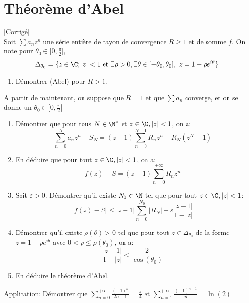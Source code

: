 \documentclass{book}
\begin{document}

\section{Théorème d'Abel}
\label{Théorème d'Abel}
\textcolor{blue}{\hyperref[sec:theoreme-dabel]{[Corrigé]}}\\
Soit  $\sum\limits a_nz^n$ une série entière de rayon de convergence $R\geq 1$ et de somme $f$. On note pour $\theta_0 \in [0,\displaystyle\frac{\pi}{2}[$, $$\Delta_{\theta_0}=\{z\in\C; |z|<1 \text{ et }\exists \rho>0,\exists\theta\in[-\theta_0,\theta_0],\ z=1-\rho e^{i\theta}\}$$ 
\begin{enumerate}[leftmargin=*]
	\item Démontrer (Abel) pour $R>1$.
\end{enumerate}
A partir de maintenant, on suppose que $R=1$ et que $\sum a_n$ converge, et on se donne un $\theta_0 \in [0,\displaystyle\frac{\pi}{2}[$
\begin{enumerate}[resume, leftmargin=*]
	\item Démontrer que pour tous $N\in\N^*$ et $z\in\C , |z|<1$, on a: $$\displaystyle\sum\limits_{n=0}^N a_nz^n -S_N=(z-1)\displaystyle\sum\limits_{n=0}^{N-1} R_nz^n -R_N(z^N-1)$$
	\item En déduire que pour tout $z\in\C, |z|<1$, on a: $$f(z)-S=(z-1)\displaystyle\sum\limits_{n=0}^{+\infty} R_nz^n$$
	\item Soit $\varepsilon>0$. Démontrer qu'il existe $N_0\in\N$ tel que pour tout $z\in\C, |z|<1$: $$|f(z)-S|\leq |z-1|\sum_{n=0}^{N_0}|R_N|+\varepsilon\frac{|z-1|}{1-|z|}$$
	\item Démontrer qu'il existe $\rho(\theta)>0$ tel que pour tout $z\in\Delta_{\theta_0}$ de la forme $z=1-\rho e^{i\theta}$ avec $0<\rho\leq \rho(\theta_0)$, on a:
	$$\frac{|z-1|}{1-|z|}\leq\frac{2}{\cos(\theta_0)}$$
	\item En déduire le théorème d'Abel.
\end{enumerate}
\underline{Application:} Démontrer que $\displaystyle\sum\limits_{n=0}^{+\infty} \frac{(-1)^n}{2n-1}=\frac{\pi}{4}$ et $\displaystyle\sum\limits_{n=1}^{+\infty} \frac{(-1)^{n-1}}{n}=\ln(2)$
\end{document}
